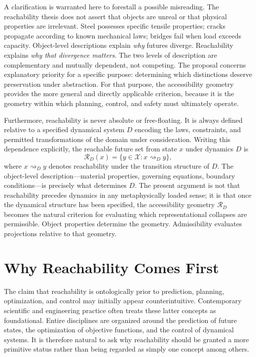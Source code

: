 \documentclass[12pt,a4paper]{article}
\theoremstyle{plain}
\theoremstyle{definition}
\theoremstyle{remark}
\begin{document}
A clarification is warranted here to forestall a possible misreading. The
reachability thesis does not assert that objects are unreal or that physical
properties are irrelevant. Steel possesses specific tensile properties; cracks
propagate according to known mechanical laws; bridges fail when load exceeds
capacity. Object-level descriptions explain \emph{why} futures diverge.
Reachability explains \emph{why that divergence matters}. The two levels of
description are complementary and mutually dependent, not competing. The
proposal concerns explanatory priority for a specific purpose: determining
which distinctions deserve preservation under abstraction. For that purpose,
the accessibility geometry provides the more general and directly applicable
criterion, because it is the geometry within which planning, control, and
safety must ultimately operate.

Furthermore, reachability is never absolute or free-floating. It is always
defined relative to a specified dynamical system $D$ encoding the laws,
constraints, and permitted transformations of the domain under consideration.
Writing this dependence explicitly, the reachable future set from state $x$
under dynamics $D$ is
\[
  \mathcal{R}_D(x)
  =
  \{y \in \mathcal{X} : x \rightsquigarrow_D y\},
\]
where $x \rightsquigarrow_D y$ denotes reachability under the transition
structure of $D$. The object-level description---material properties,
governing equations, boundary conditions---is precisely what determines $D$.
The present argument is not that reachability precedes dynamics in any
metaphysically loaded sense; it is that once the dynamical structure has been
specified, the accessibility geometry $\mathcal{R}_D$ becomes the natural
criterion for evaluating which representational collapses are permissible.
Object properties determine the geometry. Admissibility evaluates projections
relative to that geometry.

\section{Why Reachability Comes First}

The claim that reachability is ontologically prior to prediction, planning,
optimization, and control may initially appear counterintuitive. Contemporary
scientific and engineering practice often treats these latter concepts as
foundational. Entire disciplines are organized around the prediction of future
states, the optimization of objective functions, and the control of dynamical
systems. It is therefore natural to ask why reachability should be granted a
more primitive status rather than being regarded as simply one concept among
others.
\end{document}
